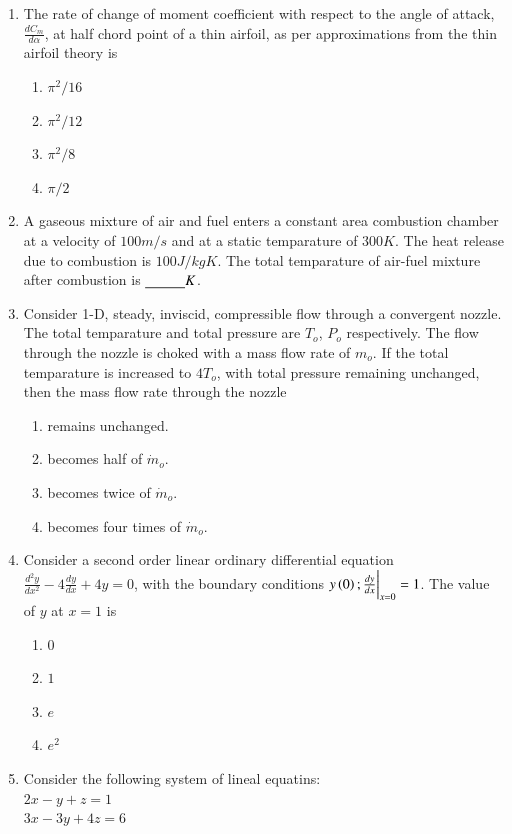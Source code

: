 \documentclass[journal,12pt,onecolumn,article]{IEEEtran}
\theoremstyle{remark}
\begin{document}
\begin{enumerate}
	\item The rate of change of moment coefficient with respect to the angle of attack, $\frac{dC_m}{d\alpha}$, at half chord point of a thin airfoil, as per approximations from the thin airfoil theory is
		\begin{enumerate}
			\item $\pi^2/16$
			\item $\pi^2/12$
			\item $\pi^2/8$
			\item $\pi/2$
		\end{enumerate}
	\item A gaseous mixture of air and fuel enters a constant area combustion chamber at a velocity of $100 m/s$ and at a static temparature of $300 K$. The heat release due to combustion is $100 J/kgK$. The total temparature of air-fuel mixture after combustion is $\underline{\hspace{1 cm}} K$.
	\item Consider 1-D, steady, inviscid, compressible flow through a convergent nozzle. The total temparature and total pressure are $T_o$, $P_o$ respectively. The flow through the nozzle is choked with a mass flow rate of $m_o$. If the total temparature is increased to $4T_o$, with total pressure remaining unchanged, then the mass flow rate through the nozzle
		\begin{enumerate}
			\item remains unchanged.
			\item becomes half of $\dot{m}_o$.
			\item becomes twice of $\dot{m}_o$.
			\item becomes four times of $\dot{m}_o$.
		\end{enumerate}
	\item Consider a second order linear ordinary differential equation $\frac{d^2y}{dx^2}-4\frac{dy}{dx}+4y=0$, with the boundary conditions $y\left(0\right);\frac{dy}{dx}\bigg|_{x=0}=1$. The value of $y$ at $x=1$ is
		\begin{enumerate}
			\item $0$
			\item $1$
			\item $e$
			\item $e^2$
		\end{enumerate}
	\item Consider the following system of lineal equatins: \\
		$2x-y+z=1$ \\
		$3x-3y+4z=6$ \\

\end{enumerate}
\end{document}
